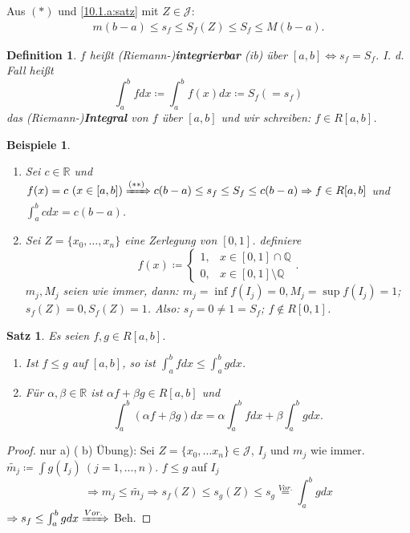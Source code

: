 \documentclass[12pt]{extreport} %
\newcommand{\Q}{\mathbb{Q}}
\newcommand{\R}{\mathbb{R}}
\theoremstyle{named}
\theoremstyle{dotless}
\newtheorem{satz}[unnamedtheorem]{Satz}
\newtheorem*{beispiele}{Beispiele}
\newtheorem*{definition}{Definition}
\begin{document}
Aus $(*)$ und \ref{10.1.a:satz} mit $Z \in \mathcal{J}$:
	\begin{align}
		m (b - a) \leq s_{f} \leq S_{f}(Z) \leq S_{f} \leq M (b - a). \tag{$**$}
	\end{align} 

   
\begin{definition}
	$f$ hei{\ss}t (Riemann-)\textbf{integrierbar} (ib) über $[a, b] \iff s_{f} = S_{f}$. I. d. Fall hei{\ss}t
		$$ \int_{a}^{b} f dx \coloneqq \int_{a}^{b} f(x) dx \coloneqq S_{f} (= s_{f}) $$
	das (Riemann-)\textbf{Integral}	von $f$ über $[a, b]$ und wir schreiben: $f \in R[a, b]$.
\end{definition}


\begin{beispiele} ~\
	\begin{enumerate}
		\item Sei $c \in \R$ und $f(x) = c ~(x \in [a, b]) \xRightarrow[]{(**)} c (b - a) \leq s_{f} \leq S_{f} \leq c(b- a) \Rightarrow f \in R[a, b]$ und $\int_{a}^{b}c dx = c(b - a)$.
		\item Sei $Z = \{ x_{0}, \dotsc, x_{n} \}$ eine Zerlegung von $[0, 1]$. definiere
			$$ f(x) \coloneqq \begin{cases} 1, & x \in [0, 1] \cap \Q \\ 0, & x \in [0, 1] \setminus \Q \end{cases}. $$  
			$m_{j}, M_{j}$ seien wie immer, dann: $m_{j} = \inf f(I_{j}) = 0, M_{j} = \sup f(I_{j}) = 1$; $s_{f}(Z) = 0, S_{f}(Z) = 1$. Also: $s_{f} = 0 \neq 1 = S_{f}$; $f \notin R[0, 1]$.
	\end{enumerate}	
\end{beispiele}

\begin{satz} \label{10.2:satz}
	Es seien $f, g \in R[a, b]$.
	\begin{enumerate}
		\item Ist $f \leq g$ auf $[a, b]$, so ist $\int_{a}^{b} f dx \leq \int_{a}^{b} g dx$.
		\item Für $\alpha, \beta \in \R$ ist $\alpha f + \beta g \in R[a, b]$ und
			$$ \int_{a}^{b} (\alpha f + \beta g) dx = \alpha \int_{a}^{b} f dx + \beta \int_{a}^{b} g dx. $$
	\end{enumerate}
\end{satz}

\begin{proof}
	nur a) ( b) Übung): Sei $Z = \{ x_{0}, \dotsc x_{n} \} \in \mathcal{J}$, $I_{j}$ und $m_{j}$ wie immer. $\tilde{m_{j}} \coloneqq \int g(I_{j}) ~(j = 1, \dotsc, n)$. $f \leq g$ auf $I_{j}$
		$$ \Rightarrow m_{j} \leq \tilde{m_{j}} \Rightarrow s_{f}(Z) \leq s_{g}(Z) \leq s_{g} \overset{Vor.}{=} \int_{a}^{b} g dx $$ 
		$\Rightarrow s_{f} \leq \int_{a}^{b} g dx \xRightarrow[]{Vor.}$ Beh.
\end{proof}
\end{document}

